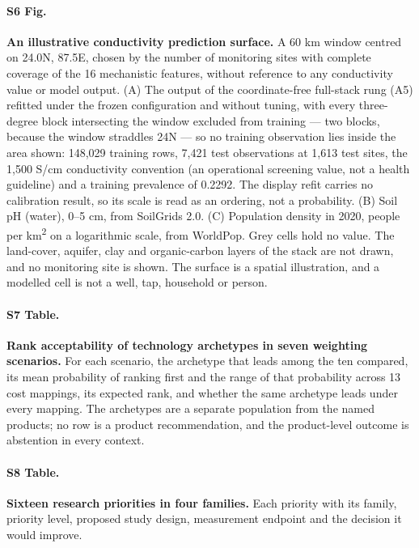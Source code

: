 \documentclass[10pt,letterpaper]{article}
\begin{document}
\paragraph*{S6 Fig.}
\label{S6_Fig}
\textbf{An illustrative conductivity prediction surface.} A 60 km window centred on 24.0\textdegree{}N, 87.5\textdegree{}E, chosen by the number of monitoring sites with complete coverage of the 16 mechanistic features, without reference to any conductivity value or model output. (A) The output of the coordinate-free full-stack rung (A5) refitted under the frozen configuration and without tuning, with every three-degree block intersecting the window excluded from training --- two blocks, because the window straddles 24\textdegree{}N --- so no training observation lies inside the area shown: 148,029 training rows, 7,421 test observations at 1,613 test sites, the 1,500 \textmu{}S/cm conductivity convention (an operational screening value, not a health guideline) and a training prevalence of 0.2292. The display refit carries no calibration result, so its scale is read as an ordering, not a probability. (B) Soil pH (water), 0--5 cm, from SoilGrids 2.0. (C) Population density in 2020, people per km\textsuperscript{2} on a logarithmic scale, from WorldPop. Grey cells hold no value. The land-cover, aquifer, clay and organic-carbon layers of the stack are not drawn, and no monitoring site is shown. The surface is a spatial illustration, and a modelled cell is not a well, tap, household or person.

\paragraph*{S7 Table.}
\label{S7_Table}
\textbf{Rank acceptability of technology archetypes in seven weighting scenarios.} For each scenario, the archetype that leads among the ten compared, its mean probability of ranking first and the range of that probability across 13 cost mappings, its expected rank, and whether the same archetype leads under every mapping. The archetypes are a separate population from the named products; no row is a product recommendation, and the product-level outcome is abstention in every context.

\paragraph*{S8 Table.}
\label{S8_Table}
\textbf{Sixteen research priorities in four families.} Each priority with its family, priority level, proposed study design, measurement endpoint and the decision it would improve.
\end{document}
